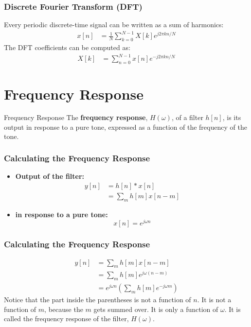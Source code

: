 \documentclass{beamer}
\begin{document}
\begin{frame}
  \frametitle{Discrete Fourier Transform (DFT)}

  Every periodic discrete-time signal can be written as a sum of
  harmonics:
  \begin{align*}
    x[n] &= \frac{1}{N}\sum_{k=0}^{N-1} X[k] e^{j2\pi k n/N}
  \end{align*}
  The DFT coefficients can be computed as:
  \begin{align*}
    X[k] &= \sum_{n=0}^{N-1} x[n]e^{-j2\pi kn/N}
  \end{align*}
\end{frame}

\section[Frequency Response]{Frequency Response}
\setcounter{subsection}{1}

\begin{frame}
  \begin{block}{Frequency Response}
    The {\bf frequency response}, $H(\omega)$, of a filter $h[n]$, is
    its output in response to a pure tone, expressed as a function of
    the frequency of the tone.
  \end{block}
\end{frame}

\begin{frame}
  \frametitle{Calculating the Frequency Response}
  \begin{itemize}
  \item {\bf Output of the filter:}
    \begin{align*}
      y[n] &= h[n]\ast x[n]\\
      &= \sum_m h[m] x[n-m]
    \end{align*}
  \item {\bf in response to a pure tone:}
    \[
    x[n] = e^{j\omega n}
    \]
  \end{itemize}
\end{frame}

\begin{frame}
  \frametitle{Calculating the Frequency Response}

  
  \begin{align*}
    y[n] &= \sum_m h[m] x[n-m]\\
    &= \sum_m h[m] e^{j\omega (n-m)}\\
    &= e^{j\omega n} \left(\sum_m h[m] e^{-j\omega m}\right)
  \end{align*}
  Notice that the part inside the parentheses is not a function of
  $n$.  It is not a function of $m$, because the $m$ gets summed over.
  It is only a function of $\omega$.  It is called the frequency
  response of the filter, $H(\omega)$.
\end{frame}
\end{document}
